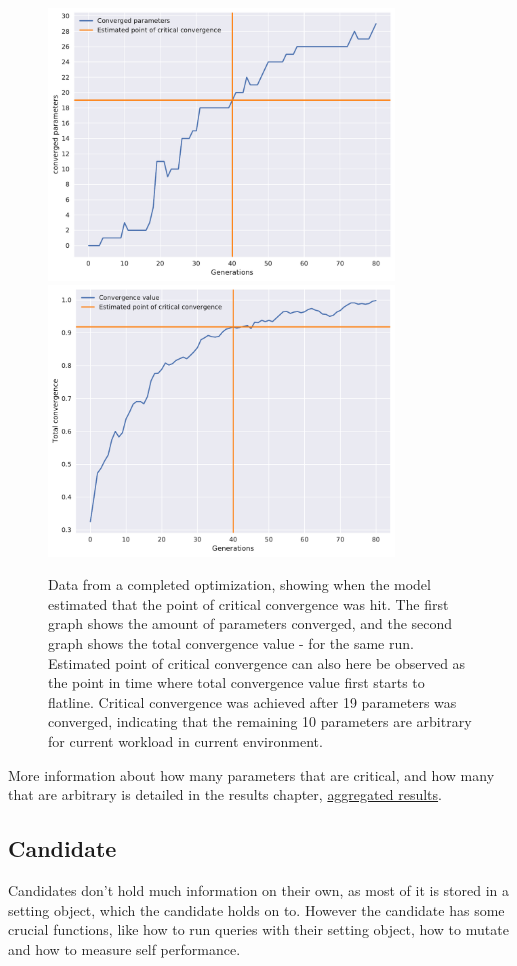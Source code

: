 \documentclass[a4paper,english]{report}
\begin{document}
		\begin{figure}[H]
			\centering
			\includegraphics[width=260pt]{est21}
			\includegraphics[width=260pt]{est22}
			\caption{Data from a completed optimization, showing when the model estimated that the point of critical convergence was hit. The first graph shows the amount of parameters converged, and the second graph shows the total convergence value - for the same run. Estimated point of critical convergence can also here be observed as the point in time where total convergence value first starts to flatline. Critical convergence was achieved after 19 parameters was converged, indicating that the remaining 10 parameters are arbitrary for current workload in current environment.}
			\label{fig:estimation2}
		\end{figure}
		More information about how many parameters that are critical, and how many that are arbitrary is detailed in the results chapter, \hyperref[sec:aggres]{aggregated results}.
		\clearpage
		\subsection{Candidate}
		Candidates don't hold much information on their own, as most of it is stored in a setting object, which the candidate holds on to. However the candidate has some crucial functions, like how to run queries with their setting object, how to mutate and how to measure self performance.
\end{document}
